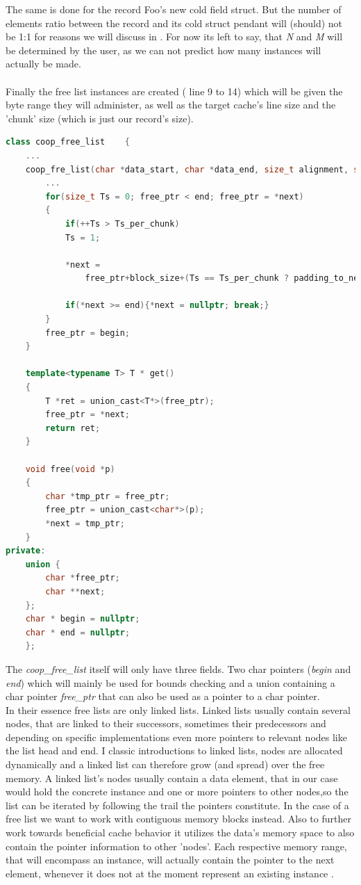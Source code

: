 The same is done for the record Foo's new cold field struct. But the number of elements ratio between the record and its cold struct pendant will (should) not be 1:1 for reasons we will discuss in . For now its left to say, that \textit{N} and \textit{M} will be determined by the user, as we can not predict how many instances will actually be made.\\\\
Finally the free list instances are created ( line 9 to 14) which will be given the byte range they will administer, as well as the target cache's line size and the 'chunk' size (which is just our record's size).
\begin{lstlisting}[language=C++,name={Shortened excerpt of COOP's freelist without asserts and some initialization code.},morekeywords={constexpr, size_t},label={free_list}]
	class coop_free_list	{
	...
	coop_fre_list(char *data_start, char *data_end, size_t alignment, size_t block_size){
		...
		for(size_t Ts = 0; free_ptr < end; free_ptr = *next)
		{
			if(++Ts > Ts_per_chunk)
			Ts = 1;
			
			*next =
				free_ptr+block_size+(Ts == Ts_per_chunk ? padding_to_next : 0);
			
			if(*next >= end){*next = nullptr; break;}
		}
		free_ptr = begin;
	}
	
	template<typename T> T * get()
	{
		T *ret = union_cast<T*>(free_ptr);
		free_ptr = *next;
		return ret;
	}
	
	void free(void *p)
	{
		char *tmp_ptr = free_ptr;
		free_ptr = union_cast<char*>(p);
		*next = tmp_ptr;
	}
private:
	union {
		char *free_ptr;
		char **next;
	};
	char * begin = nullptr;
	char * end = nullptr;
	};
\end{lstlisting}
The \textit{coop\_free\_list} itself will only have three fields. Two char pointers (\textit{begin} and \textit{end}) which will mainly be used for bounds checking and a union containing a char pointer \textit{free\_ptr} that can also be used as a pointer to a char pointer.\\
In their essence free lists are only linked lists. Linked lists usually contain several nodes, that are linked to their successors, sometimes their predecessors and depending on specific implementations even more pointers to relevant nodes like the list head and end. I classic introductions to linked lists, nodes are allocated dynamically and a linked list can therefore grow (and spread) over the free memory. A linked list's nodes usually contain a data element, that in our case would hold the concrete instance and one or more pointers to other nodes,so the list can be iterated by following the trail the pointers constitute. In the case of a free list we want to work with contiguous memory blocks instead. Also to further work towards beneficial cache behavior it utilizes the data's memory space to also contain the pointer information to other 'nodes'. Each respective memory range, that will encompass an instance, will actually contain the pointer to the next element, whenever it does not at the moment represent an existing instance .\\
